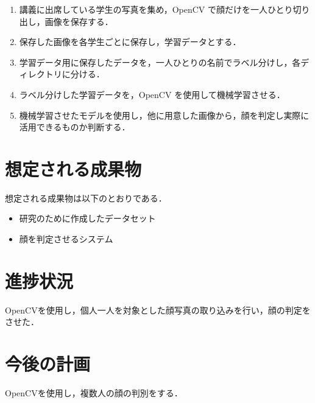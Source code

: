 \documentclass[uplatex,twocolumn,dvipdfmx]{jsarticle}
\begin{document}
\begin{enumerate}
\item 講義に出席している学生の写真を集め，OpenCV で顔だけを一人ひとり切り出し，画像を保存する．
\item 保存した画像を各学生ごとに保存し，学習データとする．
\item 学習データ用に保存したデータを，一人ひとりの名前でラベル分けし，各ディレクトリに分ける．
\item ラベル分けした学習データを，OpenCV を使用して機械学習させる．
\item 機械学習させたモデルを使用し，他に用意した画像から，顔を判定し実際に活用できるものか判断する．
\end{enumerate}

\section{想定される成果物}
想定される成果物は以下のとおりである．

\begin{itemize}
\item 研究のために作成したデータセット
\item 顔を判定させるシステム
\end{itemize}

\section{進捗状況}
OpenCVを使用し，個人一人を対象とした顔写真の取り込みを行い，顔の判定をさせた．
\section{今後の計画}
OpenCVを使用し，複数人の顔の判別をする．

\end{document}
